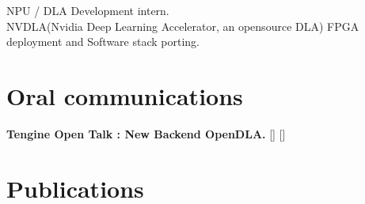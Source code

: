 \documentclass[a4paper,10pt]{article}
\begin{document}
\begin{adjustbox}{valign=t}
\begin{minipage}{0.6\textwidth}
\begin{description}
	NPU / DLA Development intern.\\
	
	NVDLA(Nvidia Deep Learning Accelerator, an opensource DLA) FPGA deployment and Software stack porting.
	
\end{description}

\section*{Oral communications}
\begin{description}
	\raggedright
	\item [\normalfont \textcolor{ColorOne}{Sep. 23th, 2021.}] 
	\textbf{Tengine Open Talk : New Backend OpenDLA.} [] []
	
\end{description}

\section*{Publications}
\begin{description}
	\raggedright
	\item [\normalfont \textcolor{ColorOne}{No Publication.}] 
\end{description}

\MySkip

\LastUpdate
\end{minipage}
\end{adjustbox}
\end{document}
